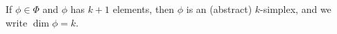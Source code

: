 If $\phi \in \Phi$ and $\phi$ has $k+1$ elements, then $\phi$ is an (abstract) $k$-simplex, and we write $\dim \phi = k$.
